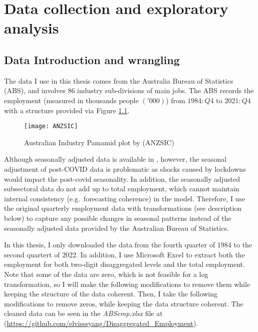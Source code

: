 \documentclass{monashthesis}
\begin{document}
\clearpage

\hypertarget{data-collection-and-exploratory-analysis}{%
\chapter{Data collection and exploratory analysis}\label{data-collection-and-exploratory-analysis}}

\hypertarget{data-introduction-and-wrangling}{%
\section{Data Introduction and wrangling}\label{data-introduction-and-wrangling}}

The data I use in this thesis comes from the Australia Bureau of Statistics (ABS), and involves 86 industry sub-divisions of main jobs. The ABS records the employment (measured in thousands people \(('000)\)) from \(1984:Q4\) to \(2021:Q4\) with a structure provided via Figure \ref{fig:anzsic}.

\graphicspath{ {/Users/elvisyang/Desktop/hon_proj/Disaggregated_Employment/Honours_thesis/figures} }

\begin{figure}[H]
\texttt{[image: ANZSIC]}
\centering
\caption{Australian Industry Pamamid plot by (ANZSIC)}
\label{fig:anzsic}
\end{figure}

Although seasonally adjusted data is available in \autocite{ABS2022}, however, the seasonal adjustment of post-COVID data is problematic as shocks caused by lockdowns would impact the post-covid seasonality. In addition, the seasonally adjusted subsectoral data do not add up to total employment, which cannot maintain internal consistency (e.g.~forecasting coherence) in the model. Therefore, I use the original quarterly employment data with transformations (see description below) to capture any possible changes in seasonal patterns instead of the seasonally adjusted data provided by the Australian Bureau of Statistics.

In this thesis, I only downloaded the data from the fourth quarter of 1984 to the second quartert of 2022. In addition, I use Microsoft Excel to extract both the employment for both two-digit disaggregated levels and the total employment. Note that some of the data are zero, which is not feasible for a log transformation, so I will make the following modifications to remove them while keeping the structure of the data coherent. Then, I take the following modifications to remove zeros, while keeping the data structure coherent. The cleaned data can be seen in the \emph{ABSemp.xlsx} file at (\url{https://github.com/elvisssyang/Disaggregated_Employment}).
\end{document}
